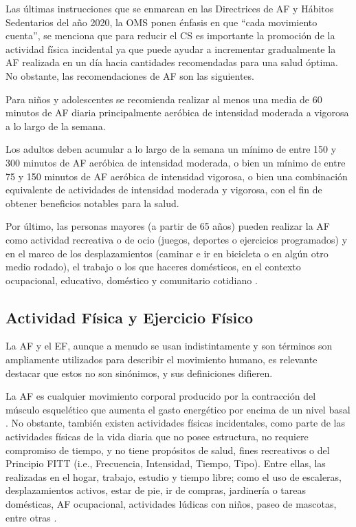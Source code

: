 Las últimas instrucciones que se enmarcan en las Directrices de AF y Hábitos Sedentarios del año 2020, la OMS ponen énfasis en que ``cada movimiento cuenta'', se menciona que para reducir el CS es importante la promoción de la actividad física incidental ya que puede ayudar a incrementar gradualmente la AF realizada en un día hacia cantidades recomendadas para una salud óptima. No obstante, las recomendaciones de AF son las siguientes.

Para niños y adolescentes se recomienda realizar al menos una media de 60 minutos de AF diaria principalmente aeróbica de intensidad moderada a vigorosa a lo largo de la semana.

Los adultos deben acumular a lo largo de la semana un mínimo de entre 150 y 300 minutos de AF aeróbica de intensidad moderada, o bien un mínimo de entre 75 y 150 minutos de AF aeróbica de intensidad vigorosa, o bien una combinación equivalente de actividades de intensidad moderada y vigorosa, con el fin de obtener beneficios notables para la salud.

Por último, las personas mayores (a partir de 65 años) pueden realizar la AF como actividad recreativa o de ocio (juegos, deportes o ejercicios programados) y en el marco de los desplazamientos (caminar e ir en bicicleta o en algún otro medio rodado), el trabajo o los que haceres domésticos, en el contexto ocupacional, educativo, doméstico y comunitario cotidiano \citep{Bull2020,WHO2020GuidelinesAnnex}.

\subsection{Actividad Física y Ejercicio Físico}
\label{subsec:af_ef}

La AF y el EF, aunque a menudo se usan indistintamente y son términos son ampliamente utilizados para describir el movimiento humano, es relevante destacar que estos no son sinónimos, y sus definiciones difieren.

La AF es cualquier movimiento corporal producido por la contracción del músculo esquelético que aumenta el gasto energético por encima de un nivel basal \citep{Caspersen1985}. No obstante, también existen actividades físicas incidentales, como parte de las actividades físicas de la vida diaria que no posee estructura, no requiere compromiso de tiempo, y no tiene propósitos de salud, fines recreativos o del Principio FITT (i.e., Frecuencia, Intensidad, Tiempo, Tipo). Entre ellas, las realizadas en el hogar, trabajo, estudio y tiempo libre; como el uso de escaleras, desplazamientos activos, estar de pie, ir de compras, jardinería o tareas domésticas, AF ocupacional, actividades lúdicas con niños, paseo de mascotas, entre otras \citep{Reyes2023Actividad}.

